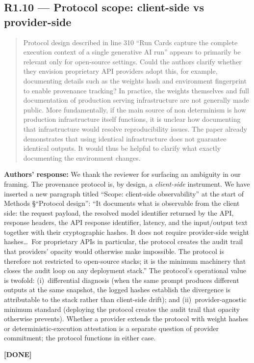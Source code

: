 \documentclass[11pt,a4paper]{article}
\newenvironment{revquote}{%
  \begin{quote}\small\itshape\color{revgray}
}{%
  \end{quote}
}
\newcommand{\response}[1]{\par\noindent\textbf{\color{revgreen}Authors' response:} #1\par}
\newcommand{\done}{\color{revgreen}\textbf{[DONE]}}
\begin{document}
\subsection*{R1.10 --- Protocol scope: client-side vs provider-side}

\begin{revquote}
Protocol design described in line 310 ``Run Cards capture the complete execution context of a single generative AI run'' appears to primarily be relevant only for open-source settings. Could the authors clarify whether they envision proprietary API providers adopt this, for example, documenting details such as the weights hash and environment fingerprint to enable provenance tracking? In practice, the weights themselves and full documentation of production serving infrastructure are not generally made public. More fundamentally, if the main source of non determinism is how production infrastructure itself functions, it is unclear how documenting that infrastructure would resolve reproducibility issues. The paper already demonstrates that using identical infrastructure does not guarantee identical outputs. It would thus be helpful to clarify what exactly documenting the environment changes.
\end{revquote}

\response{We thank the reviewer for surfacing an ambiguity in our framing. The provenance protocol is, by design, a \emph{client-side} instrument. We have inserted a new paragraph titled ``Scope: client-side observability'' at the start of Methods §``Protocol design'': ``It documents what is observable from the client side: the request payload, the resolved model identifier returned by the API, response headers, the API response identifier, latency, and the input/output text together with their cryptographic hashes. It does not require provider-side weight hashes\ldots\ For proprietary APIs in particular, the protocol creates the audit trail that providers' opacity would otherwise make impossible. The protocol is therefore not restricted to open-source stacks; it is the minimum machinery that closes the audit loop on any deployment stack.'' The protocol's operational value is twofold: (i)~differential diagnosis (when the same prompt produces different outputs at the same snapshot, the logged hashes establish the divergence is attributable to the stack rather than client-side drift); and (ii)~provider-agnostic minimum standard (deploying the protocol creates the audit trail that opacity otherwise prevents). Whether a provider extends the protocol with weight hashes or deterministic-execution attestation is a separate question of provider commitment; the protocol functions in either case.} \done
\end{document}
